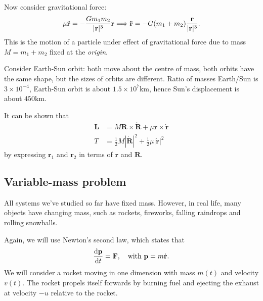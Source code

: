 Now consider gravitational force: 
\[
    \mu \ddot{{\bf r}} = -\frac{Gm_1m_2}{|{\bf r}|^3}{\bf r} \Longrightarrow \ddot{{\bf r}} = -G(m_1+m_2)\frac{{\bf r}}{|{\bf r}|^3}.
\]
This is the motion of a particle under effect of gravitational force due to mass $ M=m_1+m_2 $ fixed at the \textit{origin}.

Consider Earth-Sun orbit: both move about the centre of mass, both orbits have the same shape, but the sizes of orbits are different. Ratio of masses Earth/Sun is $ 3\times 10^{-4} $, Earth-Sun orbit is about $ 1.5\times 10^7 \mathrm{km} $, hence Sun's displacement is about $ 450\mathrm{km} $.

It can be shown that
\begin{align*}
  \mathbf{L} &= M\mathbf{R} \times \dot{\mathbf{R}} + \mu \mathbf{r}\times \dot{\mathbf{r}}\\
  T &= \frac{1}{2} M|\dot{\mathbf{R}}|^2 + \frac{1}{2}\mu |\dot{\mathbf{r}}|^2
\end{align*}
by expressing $\mathbf{r}_1$ and $\mathbf{r}_2$ in terms of $\mathbf{r}$ and $\mathbf{R}$.

\subsection{Variable-mass problem}
All systems we've studied so far have fixed mass. However, in real life, many objects have changing mass, such as rockets, fireworks, falling raindrops and rolling snowballs.

Again, we will use Newton's second law, which states that
\[
  \frac{\mathrm{d} \mathbf{p}}{\mathrm{d} t} = \mathbf{F},\quad\text{with }\mathbf{p} = m\dot{\mathbf{r}}.
\]
We will consider a rocket moving in one dimension with mass $m(t)$ and velocity $v(t)$. The rocket propels itself forwards by burning fuel and ejecting the exhaust at velocity $-u$ relative to the rocket.

